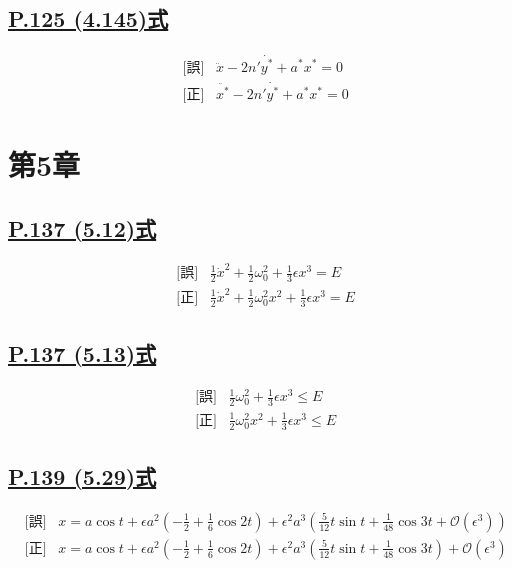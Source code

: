 \documentclass[9pt,fleqn]{bxjsarticle}
\begin{document}
\subsection*{\underline{P.125 (4.145)式}}
\begin{align*}
    &\text{[誤]} \hspace{10pt} \ddot{x} - 2n'\dot{y^*} + a^*x^* = 0 \\
    &\text{[正]} \hspace{10pt} \ddot{x^*} - 2n'\dot{y^*} + a^*x^* = 0 
\end{align*}


\section*{第5章}

\subsection*{\underline{P.137 (5.12)式}}
\begin{align*}
    &\text{[誤]} \hspace{10pt} \frac{1}{2}\dot{x}^2 + \frac{1}{2}\omega_0^2 + \frac{1}{3}{\epsilon}x^3 = E \\
    &\text{[正]} \hspace{10pt} \frac{1}{2}\dot{x}^2 + \frac{1}{2}\omega_0^2x^2 + \frac{1}{3}{\epsilon}x^3 = E 
\end{align*}

\subsection*{\underline{P.137 (5.13)式}}
\begin{align*}
    &\text{[誤]} \hspace{10pt} \frac{1}{2}\omega_0^2 + \frac{1}{3}{\epsilon}x^3 \leq E \\
    &\text{[正]} \hspace{10pt} \frac{1}{2}\omega_0^2x^2 + \frac{1}{3}{\epsilon}x^3 \leq E 
\end{align*}

\subsection*{\underline{P.139 (5.29)式}}
\begin{align*}
    &\text{[誤]} \hspace{10pt} x = a\cos{t} + {\epsilon}a^2\left(-\frac{1}{2}+\frac{1}{6}\cos{2t}\right) + \epsilon^2a^3\left(\frac{5}{12}t\sin{t}+\frac{1}{48}\cos{3t}+\mathcal{O}(\epsilon^3)\right) \\
    &\text{[正]} \hspace{10pt} x = a\cos{t} + {\epsilon}a^2\left(-\frac{1}{2}+\frac{1}{6}\cos{2t}\right) + \epsilon^2a^3\left(\frac{5}{12}t\sin{t}+\frac{1}{48}\cos{3t}\right) + \mathcal{O}(\epsilon^3)  
\end{align*}
\end{document}
